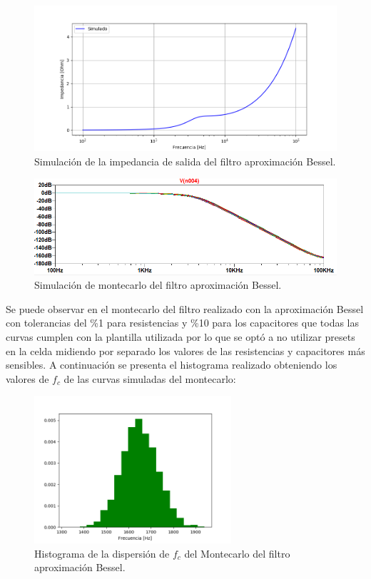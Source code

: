 \begin{figure}[H]
\centering
	\centering
	\includegraphics[width=\textwidth]{Imagenes-Ej1/bessel_zout_sim.png}
	\caption{Simulación de la impedancia de salida del filtro aproximación Bessel.}
	\label{bes_zout_sim}
\end{figure}

\begin{figure}[H]
\centering
	\centering
	\includegraphics[width=\textwidth]{Imagenes-Ej1/bessel_mont.png}
	\caption{Simulación de montecarlo del filtro aproximación Bessel.}
	\label{bes_mont_sim}
\end{figure}

Se puede observar en el montecarlo del filtro realizado con la aproximación Bessel con tolerancias del \%1  para resistencias y \%10 para los capacitores que todas las curvas cumplen con la plantilla utilizada por lo que se optó a no utilizar presets en la celda midiendo por separado los valores de las resistencias y capacitores más sensibles. A continuación se presenta el histograma realizado obteniendo los valores de $f_c$ de las curvas simuladas del montecarlo:

\begin{figure}[H]
\centering
	\centering
	\includegraphics[width=0.65\textwidth]{Imagenes-Ej1/histobes.png}
	\caption{Histograma de la dispersión de $f_c$ del Montecarlo del filtro aproximación Bessel.}
\end{figure}


